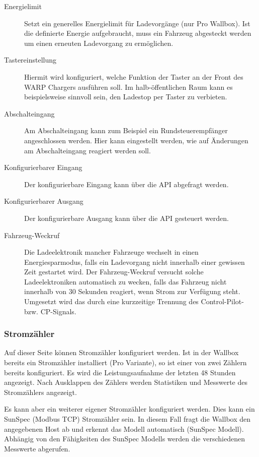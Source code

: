 \documentclass[a4paper,10pt]{article}
\begin{document}
\begin{multicols*}{2}
\begin{description}
	 \item[Energielimit] Setzt ein generelles Energielimit für Ladevorgänge (nur Pro Wallbox). Ist die definierte Energie aufgebraucht, muss ein Fahrzeug abgesteckt werden um einen erneuten Ladevorgang zu ermöglichen.
	 \item[Tastereinstellung] Hiermit wird konfiguriert, welche Funktion der Taster an der Front
	 des WARP Chargers ausführen soll. Im halb-öffentlichen Raum kann es beispielsweise sinnvoll sein,
	 den Ladestop per Taster zu verbieten.
	 \item[Abschalteingang] Am Abschalteingang kann zum Beispiel ein Rundsteuerempfänger angeschlossen werden.
	 Hier kann eingestellt werden, wie auf Änderungen am Abschalteingang reagiert werden soll.
	 \item[Konfigurierbarer Eingang] Der konfigurierbare Eingang kann über die API abgefragt werden.
	 \item[Konfigurierbarer Ausgang] Der konfigurierbare Ausgang kann über die API gesteuert werden.
	 \item[Fahrzeug-Weckruf] Die Ladeelektronik mancher Fahrzeuge wechselt in einen Energiesparmodus, falls ein Ladevorgang nicht innerhalb einer gewissen Zeit gestartet wird. Der Fahrzeug-Weckruf versucht solche Ladeelektroniken automatisch zu wecken, falls das Fahrzeug nicht innerhalb von 30 Sekunden reagiert, wenn Strom zur Verfügung steht. Umgesetzt wird das durch eine kurzzeitige Trennung des Control-Pilot- bzw. CP-Signals.
	\end{description}

	 \vfill
	 \null

	\columnbreak

	\subsubsection{Stromzähler}
	Auf dieser Seite können Stromzähler konfiguriert werden. Ist in der Wallbox
	bereits ein Stromzähler installiert (Pro Variante), so ist einer von zwei
	Zählern bereits konfiguriert. Es wird die Leistungsaufnahme der letzten 48
	Stunden angezeigt. Nach Ausklappen des Zählers werden Statistiken und
	Messwerte des Stromzählers angezeigt.

	Es kann aber ein weiterer eigener Stromzähler konfiguriert werden. Dies kann
	ein SunSpec (Modbus TCP) Stromzähler sein. In diesem Fall fragt die Wallbox
	den angegebenen Host ab und erkennt das Modell automatisch (SunSpec Modell).
	Abhängig von den Fähigkeiten des SunSpec Modells werden die verschiedenen
	Messwerte abgerufen.


\end{multicols*}
\end{document}
